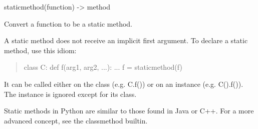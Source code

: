 \documentclass[letterpaper,10pt,english]{sphinxmanual}
\begin{document}
\begin{fulllineitems}

\begin{fulllineitems}
\label{handler/handlers:RESThandlers.Streetlight.Handler.StreetlightHandler.get_item_count}
\end{fulllineitems}


\begin{fulllineitems}
\label{handler/handlers:RESThandlers.Streetlight.Handler.StreetlightHandler.get_near}
\end{fulllineitems}


\begin{fulllineitems}
\label{handler/handlers:RESThandlers.Streetlight.Handler.StreetlightHandler.get_within_rectangle}
\end{fulllineitems}


\begin{fulllineitems}
\label{handler/handlers:RESThandlers.Streetlight.Handler.StreetlightHandler.handler_id}
staticmethod(function) -\textgreater{} method

Convert a function to be a static method.

A static method does not receive an implicit first argument.
To declare a static method, use this idiom:
\begin{quote}

class C:
def f(arg1, arg2, ...): ...
f = staticmethod(f)
\end{quote}

It can be called either on the class (e.g. C.f()) or on an instance
(e.g. C().f()).  The instance is ignored except for its class.

Static methods in Python are similar to those found in Java or C++.
For a more advanced concept, see the classmethod builtin.


\end{fulllineitems}
\end{fulllineitems}
\end{document}
